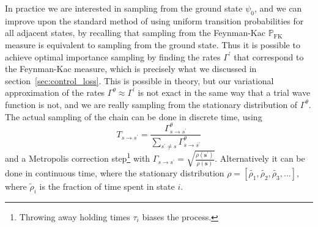 In practice we are interested in sampling from the ground state $\psi_0$, and we can improve upon the standard method of using uniform transition probabilities for all adjacent states, by recalling that sampling from the Feynman-Kac $\mathbb{P}_\text{FK}$ measure is equivalent to sampling from the ground state. Thus it is possible to achieve optimal importance sampling by finding the rates $\Gamma^\prime$ that correspond to the Feynman-Kac measure, which is precisely what we discussed in section~\ref{sec:control_loss}. This is possible in theory, but our variational approximation of the rates $\Gamma^{\theta} \approx \Gamma^\prime$ is not exact in the same way that a trial wave function is not, and we are really sampling from the stationary distribution of $\Gamma^\theta$. The actual sampling of the chain can be done in discrete time, using 
\begin{equation}
	T_{s \rightarrow s^{\prime}}=\frac{\Gamma_{s \rightarrow s^{\prime}}^{\theta}}{\sum_{s^{\prime} \neq s} \Gamma_{s \rightarrow s^{\prime}}^{\theta}}
\end{equation}
and a Metropolis correction step\footnote{Throwing away holding times $\tau_i$ biases the process.} with $\Gamma_{s \rightarrow s^{\prime}}=\sqrt{\frac{\rho\left(\boldsymbol{s}^{\prime}\right)}{\rho(\boldsymbol{s})}}$. Alternatively it can be done in continuous time, where the stationary distribution $\rho = \left[ \tilde{\rho_1}, \tilde{\rho_2}, \tilde{\rho_3}, \ldots \right]$, where $\tilde \rho_i$ is the fraction of time spent in state $i$. 

